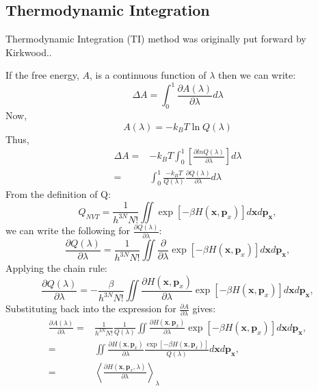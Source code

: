 \subsection{Thermodynamic Integration\label{Sec:FEM:TI}}
Thermodynamic Integration (TI) method was originally put forward by Kirkwood.\cite{KirkwoodJCP1935}. 
	
If the free energy, $A$, is a continuous function of $\lambda$ then we can write:
\begin{equation}
\Delta A = \int_{0}^{1} \frac{\partial{A(\lambda)}}{\partial{\lambda}} d\lambda
\label{Eq:deltaA1TI}
\end{equation} 
Now,
\begin{equation}
A(\lambda) = -k_{B}T\ln Q(\lambda)
\label{Eq:Alambda}
\end{equation} 
Thus,
\begin{align}
\Delta A =& -k_{B}T\int_{0}^{1} \left[ \frac{\partial{lnQ(\lambda)}}{\partial{\lambda}} \right]d\lambda \\
=&\int_{0}^{1}\frac{-k_{B}T}{Q(\lambda)}\frac{\partial{Q(\lambda)}}{\partial{\lambda}}d\lambda
\label{Eq:deltaA2TI}
\end{align} 
From the definition of Q:
\begin{equation}
Q_{NVT} = \frac{1}{{h}^{3N}N!} \iint \exp[-\beta H(\textbf{x},\textbf{p}_{x})] d\textbf{x}d\textbf{p}_\textbf{x},
\label{Eq:PFTI}
\end{equation}
we can write the following for $\frac{\partial{Q(\lambda)}}{\partial{\lambda}}$:
\begin{equation}
\frac{\partial{Q(\lambda)}}{\partial{\lambda}} = \frac{1}{{h}^{3N}N!} \iint \frac{\partial}{\partial{\lambda}}\exp[-\beta H(\textbf{x},\textbf{p}_{x})] d\textbf{x}d\textbf{p}_\textbf{x},
\label{Eq:PPF}
\end{equation}
Applying the chain rule:
\begin{equation}
\frac{\partial{Q(\lambda)}}{\partial{\lambda}} = -\frac{\beta}{{h}^{3N}N!} \iint \frac{\partial{H(\textbf{x},\textbf{p}_{x})}}{\partial{\lambda}}\exp[-\beta H(\textbf{x},\textbf{p}_{x})] d\textbf{x}d\textbf{p}_\textbf{x},
\label{Eq:PPF2}
\end{equation}
Substituting back into the expression for $\frac{\partial{A}}{\partial{\lambda}}$ gives:
\begin{align}
\frac{\partial{A(\lambda)}}{\partial{\lambda}} =& \frac{1}{{h}^{3N}N!}\frac{1}{Q(\lambda)} \iint \frac{\partial{H(\textbf{x},\textbf{p}_{x})}}{\partial{\lambda}}\exp[-\beta H(\textbf{x},\textbf{p}_{x})] d\textbf{x}d\textbf{p}_\textbf{x}, \\
=& \iint \frac{\partial{H(\textbf{x},\textbf{p}_{x})}}{\partial{\lambda}}\frac{\exp[-\beta H(\textbf{x},\textbf{p}_{x})]}{Q(\lambda)} d\textbf{x}d\textbf{p}_\textbf{x}, \\
=& \left \langle \frac{\partial{H(\textbf{x},\textbf{p}_{x}, \lambda)}}{\partial{\lambda}} \right \rangle_{\lambda}
\label{Eq:PA2}
\end{align}
